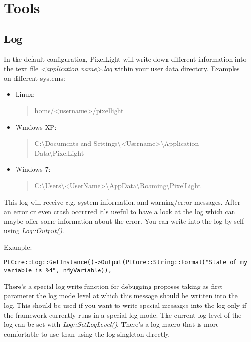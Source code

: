 \section{Tools}




\subsection{Log}
In the default configuration, PixelLight will write down different information into the text file \emph{<application name>.log} within your user data directory. Examples on different systems:
\begin{itemize}
\item{Linux: \begin{quote}home/<username>/pixellight\end{quote}}
\item{Windows XP: \begin{quote}C:\textbackslash Documents and Settings\textbackslash <Username>\textbackslash Application Data\textbackslash PixelLight\end{quote}}
\item{Windows 7: \begin{quote}C:\textbackslash Users\textbackslash <UserName>\textbackslash AppData\textbackslash Roaming\textbackslash PixelLight\end{quote}}
\end{itemize}

This log will receive e.g. system information and warning/error messages. After an error or even crash occurred it's useful to have a look at the log which can maybe offer some information about the error. You can write into the log by self using \emph{Log::Output()}.

Example:
\begin{lstlisting}[caption=Using the log singleton directly]
PLCore::Log::GetInstance()->Output(PLCore::String::Format("State of my variable is %d", nMyVariable));
\end{lstlisting}

There's a special log write function for debugging proposes taking as first parameter the log mode level at which this message should be written into the log. This should be used if you want to write special messages into the log only if the framework currently runs in a special log mode. The current log level of the log can be set with \emph{Log::SetLogLevel()}. There's a log macro that is more comfortable to use than using the log singleton directly.

